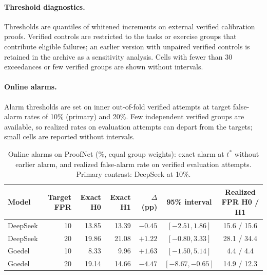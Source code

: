 \paragraph{Threshold diagnostics.} Thresholds are quantiles of whitened increments on external verified calibration proofs. Verified controls are restricted to the tasks or exercise groups that contribute eligible failures; an earlier version with unpaired verified controls is retained in the archive as a sensitivity analysis. Cells with fewer than 30 exceedances or few verified groups are shown without intervals.

\paragraph{Online alarms.} Alarm thresholds are set on inner out-of-fold verified attempts at target false-alarm rates of 10\% (primary) and 20\%. Few independent verified groups are available, so realized rates on evaluation attempts can depart from the targets; small cells are reported without intervals.

\begin{table}[h]
\caption{Online alarms on ProofNet (\%, equal group weights): exact alarm at $t^*$ without earlier alarm, and realized false-alarm rate on verified evaluation attempts. Primary contrast: DeepSeek at 10\%.}
\label{tab:online}
\begin{center}
\small
\setlength{\tabcolsep}{4pt}
\begin{tabular}{lrrrrcc}
\toprule
Model & Target FPR & Exact H0 & Exact H1 & $\Delta$ (pp) & 95\% interval & Realized FPR H0 / H1\\
\midrule
DeepSeek & 10 & 13.85 & 13.39 & $-0.45$ & $[-2.51, 1.86]$ & 15.6 / 15.6\\
DeepSeek & 20 & 19.86 & 21.08 & $+1.22$ & $[-0.80, 3.33]$ & 28.1 / 34.4\\
Goedel & 10 & 8.33 & 9.96 & $+1.63$ & $[-1.50, 5.14]$ & 4.4 / 4.4\\
Goedel & 20 & 19.14 & 14.66 & $-4.47$ & $[-8.67, -0.65]$ & 14.9 / 12.3\\
\bottomrule
\end{tabular}
\end{center}
\end{table}

